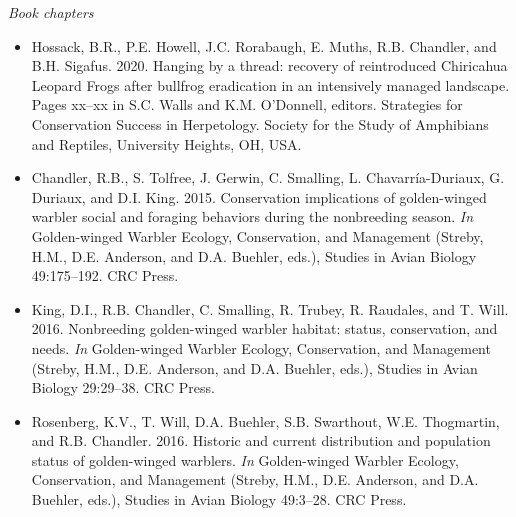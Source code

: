 




\begin{comment}
\emph{Technical Reports}
\begin{itemize}
  \item Chandler, R.B., D.I. King, and C.C. Chandler. 2006. Butterfly
    occurrence and species richness in wildlife openings and clearcuts
    on the White Mountain National Forest. A Report to the Wildlife TES
    Program, White Mountain National Forest.
\end{itemize}
\end{comment}


\emph{Book chapters}
\begin{itemize}

  \item Hossack, B.R., P.E. Howell, J.C. Rorabaugh, E. Muths,
    R.B. Chandler, and B.H. Sigafus. 2020. Hanging by a thread:
    recovery of reintroduced Chiricahua Leopard Frogs after bullfrog
    eradication in an intensively managed landscape. Pages xx–xx in
    S.C. Walls and K.M. O'Donnell, editors. Strategies for
    Conservation Success in Herpetology. Society for the Study of
    Amphibians and Reptiles, University Heights, OH, USA.   

  \item Chandler, R.B., S. Tolfree, J. Gerwin, C. Smalling,
    L. Chavarr\'ia-Duriaux, G. Duriaux, and
    D.I. King. 2015. Conservation implications of golden-winged 
    warbler social and  
    foraging behaviors during the nonbreeding season. {{\it In}
      Golden-winged Warbler Ecology, Conservation, and Management}
    (Streby, H.M., D.E. Anderson, and D.A. Buehler, eds.), Studies in
    Avian Biology 49:175--192. CRC Press. 

  \item King, D.I., R.B. Chandler, C. Smalling, R. Trubey,
    R. Raudales, and T. Will. 2016. Nonbreeding golden-winged
    warbler habitat: status, conservation, and needs. {{\it In} Golden-winged
    Warbler Ecology, Conservation, and Management} (Streby, H.M.,
    D.E. Anderson, and D.A. Buehler, eds.), Studies in Avian Biology
    29:29--38. CRC Press. 

  \item Rosenberg, K.V., T. Will, D.A. Buehler, S.B. Swarthout,
    W.E. Thogmartin, and R.B. Chandler. 2016. Historic and current
    distribution and population status of golden-winged warblers. {\it
      In} Golden-winged Warbler Ecology, Conservation, and Management
    (Streby, H.M., D.E. Anderson, and D.A. Buehler, eds.), Studies in
    Avian Biology 49:3--28. CRC Press. 


\end{itemize}
